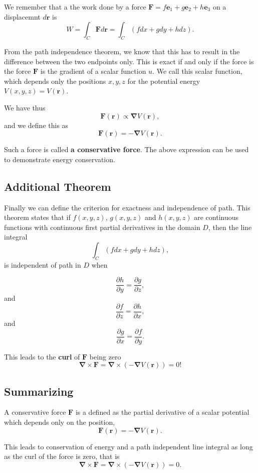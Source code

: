 \documentclass[%
oneside,                 %
final,                   %
10pt]{article}
\begin{document}
We remember that a the work done by a force
$\bm{F}=f\bm{e}_1+g\bm{e}_2+h\bm{e}_3$ on a displacemnt $d\bm{r}$
is
\[
W=\int_C\bm{F}d\bm{r}=\int_C(fdx+gdy+hdz).
\]

From the path independence theorem, we know that this has to result in
the difference between the two endpoints only. This is exact if and
only if the force is the force $\bm{F}$ is the gradient of a scalar
function $u$. We call this scalar function, which depends only the
positions $x,y,z$ for the potential energy $V(x,y,z)=V(\bm{r})$.

We have thus
\[
\bm{F}(\bm{r})\propto \bm{\nabla}V(\bm{r}),
\]
and we define  this as
\[
\bm{F}(\bm{r})= -\bm{\nabla}V(\bm{r}).
\]

Such a force is called \textbf{a conservative force}. The above expression can be used to demonstrate
energy conservation.

\subsection*{Additional Theorem}

Finally we can define the criterion for exactness and independence of
path. This theorem states that if $f(x,y,z)$, $g(x,y,z)$ and
$h(x,y,z)$ are continuous functions with continuous first partial derivatives in the domain $D$,
then the line integral
\[
\int_C\left(fdx+gdy+hdz\right),
\]
is independent of path in $D$ when

\[
\frac{\partial h}{\partial y}=\frac{\partial g}{\partial z},
\]
and
\[
\frac{\partial f}{\partial z}=\frac{\partial h}{\partial x},
\]
and
\[
\frac{\partial g}{\partial x}=\frac{\partial f}{\partial y}.
\]

This leads to the \textbf{curl} of $\bm{F}$ being zero
\[
\bm{\nabla}\times\bm{F}=\bm{\nabla}\times\left(-\bm{\nabla}V(\bm{r})\right)=0!
\]

\subsection*{Summarizing}

A conservative force $\bm{F}$ is a defined as the partial derivative of a scalar potential which depends only on the position,
\[
\bm{F}(\bm{r})= -\bm{\nabla}V(\bm{r}).
\]

This leads to conservation of energy and a path independent line integral as long as the curl of the force is zero, that is
\[
\bm{\nabla}\times\bm{F}=\bm{\nabla}\times\left(-\bm{\nabla}V(\bm{r})\right)=0.
\]

\end{document}
